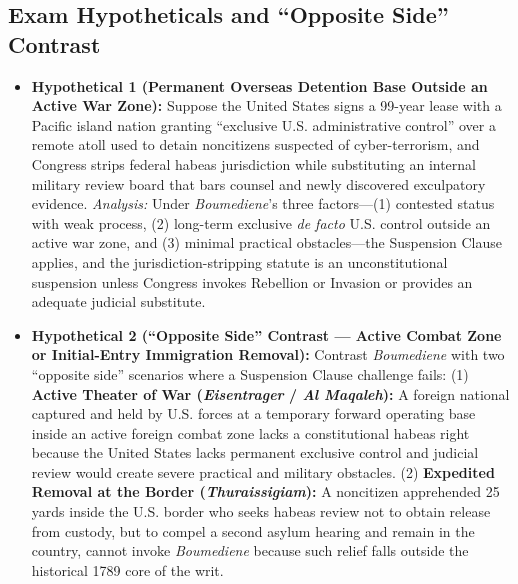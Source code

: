 \documentclass[12pt]{article}
\begin{document}
\subsection{Exam Hypotheticals and ``Opposite Side'' Contrast}
\begin{itemize}
  \item \textbf{Hypothetical 1 (Permanent Overseas Detention Base Outside an Active War Zone):} Suppose the United States signs a 99-year lease with a Pacific island nation granting ``exclusive U.S. administrative control'' over a remote atoll used to detain noncitizens suspected of cyber-terrorism, and Congress strips federal habeas jurisdiction while substituting an internal military review board that bars counsel and newly discovered exculpatory evidence. \textit{Analysis:} Under \textit{Boumediene}'s three factors---(1) contested status with weak process, (2) long-term exclusive \textit{de facto} U.S. control outside an active war zone, and (3) minimal practical obstacles---the Suspension Clause applies, and the jurisdiction-stripping statute is an unconstitutional suspension unless Congress invokes Rebellion or Invasion or provides an adequate judicial substitute.
  \item \textbf{Hypothetical 2 (``Opposite Side'' Contrast --- Active Combat Zone or Initial-Entry Immigration Removal):} Contrast \textit{Boumediene} with two ``opposite side'' scenarios where a Suspension Clause challenge fails: (1) \textbf{Active Theater of War (\textit{Eisentrager} / \textit{Al Maqaleh}):} A foreign national captured and held by U.S. forces at a temporary forward operating base inside an active foreign combat zone lacks a constitutional habeas right because the United States lacks permanent exclusive control and judicial review would create severe practical and military obstacles. (2) \textbf{Expedited Removal at the Border (\textit{Thuraissigiam}):} A noncitizen apprehended 25 yards inside the U.S. border who seeks habeas review not to obtain release from custody, but to compel a second asylum hearing and remain in the country, cannot invoke \textit{Boumediene} because such relief falls outside the historical 1789 core of the writ.
\end{itemize}
\end{document}
